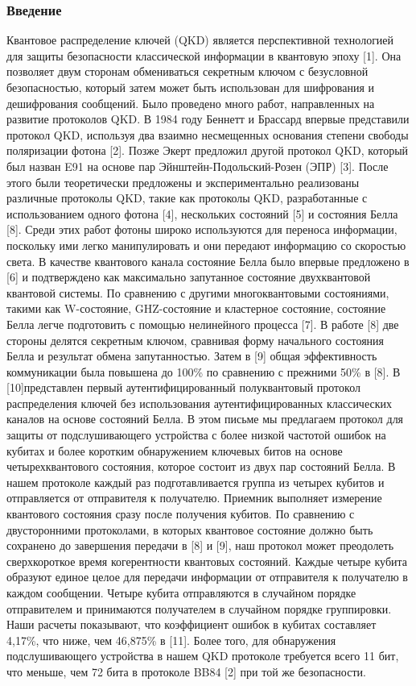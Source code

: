 \subsubsection{Введение}
Квантовое распределение ключей (QKD) является перспективной технологией для защиты безопасности классической информации в квантовую эпоху [1]. Она позволяет двум сторонам обмениваться секретным ключом с безусловной безопасностью, который затем может быть использован для шифрования и дешифрования сообщений. Было проведено много работ, направленных на развитие протоколов QKD. В 1984 году Беннетт и Брассард впервые представили протокол QKD, используя два взаимно несмещенных основания степени свободы поляризации фотона [2]. Позже Экерт предложил другой протокол QKD, который был назван E91 на основе пар Эйнштейн-Подольский-Розен (ЭПР) [3]. После этого были теоретически предложены и экспериментально реализованы различные протоколы QKD, такие как протоколы QKD, разработанные с использованием одного фотона [4], нескольких состояний [5] и состояния Белла [8]. Среди этих работ фотоны широко используются для переноса информации, поскольку ими легко манипулировать и они передают информацию со скоростью света.
В качестве квантового канала состояние Белла было впервые предложено в [6] и подтверждено как максимально запутанное состояние двухквантовой квантовой системы. По сравнению с другими многоквантовыми состояниями, такими как W-состояние, GHZ-состояние и кластерное состояние, состояние Белла легче подготовить с помощью нелинейного процесса [7]. В работе [8] две стороны делятся секретным ключом, сравнивая форму начального состояния Белла и результат обмена запутанностью.
Затем в [9] общая эффективность коммуникации была повышена до 100\% по сравнению с прежними 50\% в [8]. В [10]представлен первый аутентифицированный полуквантовый протокол распределения ключей без использования аутентифицированных классических каналов на основе состояний Белла. В этом письме мы предлагаем протокол для защиты от подслушивающего устройства с более низкой частотой ошибок на кубитах и более коротким обнаружением ключевых битов на основе четырехквантового состояния, которое состоит из двух пар состояний Белла.
В нашем протоколе каждый раз подготавливается группа из четырех кубитов и отправляется от отправителя к получателю. Приемник выполняет измерение квантового состояния сразу после получения кубитов. По сравнению с двусторонними протоколами, в которых квантовое состояние должно быть сохранено до завершения передачи в [8] и [9], наш протокол может преодолеть сверхкороткое время когерентности квантовых состояний.
Каждые четыре кубита образуют единое целое для передачи информации от отправителя к получателю в каждом сообщении. Четыре кубита отправляются в случайном порядке отправителем и принимаются получателем в случайном порядке группировки. Наши расчеты показывают, что коэффициент ошибок в кубитах составляет 4,17\%, что ниже, чем 46,875\% в [11]. Более того, для обнаружения подслушивающего устройства в нашем QKD протоколе требуется всего 11 бит, что меньше, чем 72 бита в протоколе BB84 [2] при той же безопасности.
